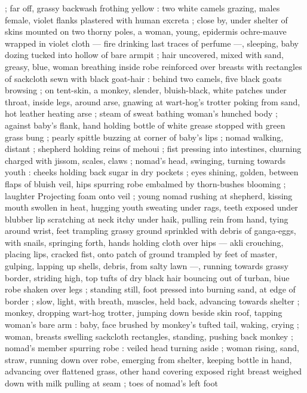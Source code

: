 ; far off, grassy backwash frothing yellow : two white camels grazing, 
males female, violet flanks plastered with human excreta ; close by, 
under shelter of skins mounted on two thorny poles, a woman, 
young, epidermis ochre-mauve wrapped in violet cloth --- fire 
drinking last traces of perfume ---, sleeping, baby dozing tucked into 
hollow of bare armpit ; hair uncovered, mixed with sand, greasy, 
blue, woman breathing inside robe reinforced over breasts with 
rectangles of sackcloth sewn with black goat-hair : behind two 
camels, five black goats browsing ; on tent-skin, a monkey, slender, 
bluish-black, white patches under throat, inside legs, around arse, 
gnawing at wart-hog's trotter poking from sand, hot leather heating 
arse ; steam of sweat bathing woman's hunched body ; against 
baby's flank, hand holding bottle of white grease stopped with green 
grass bung ; pearly spittle buzzing at corner of baby's lips ; nomad 
walking, distant ; shepherd holding reins of mehoui ; fist pressing 
into intestines, churning charged with jissom, scales, claws ; nomad's 
head, swinging, turning towards youth : cheeks holding back sugar 
in dry pockets ; eyes shining, golden, between flaps of bluish veil, 
hips spurring robe embalmed by thorn-bushes blooming ; laughter 
Projecting foam onto veil ; young nomad rushing at shepherd, kissing 
mouth swollen in heat, hugging youth sweating under rags, teeth 
exposed under blubber lip scratching at neck itchy under haik, 
pulling rein from hand, tying around wrist, feet trampling grassy 
ground sprinkled with debris of ganga-eggs, with snails, springing 
forth, hands holding cloth over hips --- akli crouching, placing lips, 
cracked fist, onto patch of ground trampled by feet of master, 
gulping, lapping up shells, debris, from salty lawn ---, running 
towards grassy border, striding high, top tufts of dry black hair 
bouncing out of turban, biue robe shaken over legs ; standing still, 
foot pressed into burning sand, at edge of border ; slow, light, with 
breath, muscles, held back, advancing towards shelter ; monkey, 
dropping wart-hog trotter, jumping down beside skin roof, tapping 
woman's bare arm : baby, face brushed by monkey's tufted tail, 
waking, crying ; woman, breasts swelling sackcloth rectangles, 
standing, pushing back monkey ; nomad's member spurring robe : 
veiled head turning aside ; woman rising, sand, straw, running down 
over robe, emerging from shelter, keeping bottle in hand, advancing 
over flattened grass, other hand covering exposed right breast 
weighed down with milk pulling at seam ; toes of nomad's left foot 
